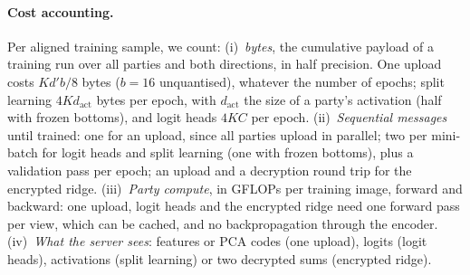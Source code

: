 \paragraph{Cost accounting.}\label{sec:accounting}
Per aligned training sample, we count: (i)~\emph{bytes}, the cumulative payload of a training run over all parties and both directions, in half precision. One upload costs $Kd'b/8$ bytes ($b=16$ unquantised), whatever the number of epochs; split learning $4Kd_{\mathrm{act}}$ bytes per epoch, with $d_{\mathrm{act}}$ the size of a party's activation (half with frozen bottoms), and logit heads $4KC$ per epoch. (ii)~\emph{Sequential messages} until trained: one for an upload, since all parties upload in parallel; two per mini-batch for logit heads and split learning (one with frozen bottoms), plus a validation pass per epoch; an upload and a decryption round trip for the encrypted ridge. (iii)~\emph{Party compute}, in GFLOPs per training image, forward and backward: one upload, logit heads and the encrypted ridge need one forward pass per view, which can be cached, and no backpropagation through the encoder. (iv)~\emph{What the server sees}: features or PCA codes (one upload), logits (logit heads), activations (split learning) or two decrypted sums (encrypted ridge).
